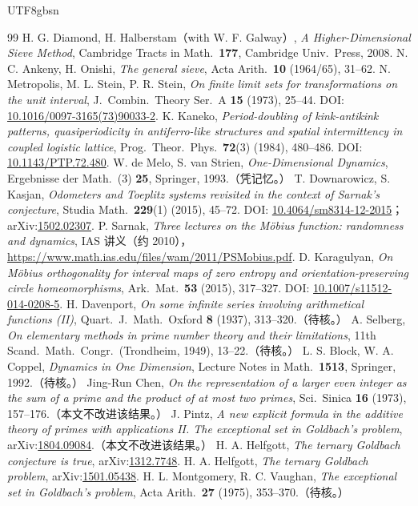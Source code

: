 \documentclass[11pt,a4paper]{article}
\theoremstyle{plain}
\theoremstyle{definition}
\begin{document}
\begin{CJK}{UTF8}{gbsn}
\begin{thebibliography}{99}
 H. G. Diamond, H. Halberstam（with W. F. Galway）, \emph{A Higher-Dimensional Sieve Method}, Cambridge Tracts in Math.\ \textbf{177}, Cambridge Univ.\ Press, 2008.
 N. C. Ankeny, H. Onishi, \emph{The general sieve}, Acta Arith.\ \textbf{10} (1964/65), 31--62.
 N. Metropolis, M. L. Stein, P. R. Stein, \emph{On finite limit sets for transformations on the unit interval},
J.\ Combin.\ Theory Ser.\ A \textbf{15} (1973), 25--44. DOI: \url{10.1016/0097-3165(73)90033-2}.
 K. Kaneko, \emph{Period-doubling of kink-antikink patterns, quasiperiodicity in antiferro-like structures and spatial intermittency in coupled logistic lattice},
Prog.\ Theor.\ Phys.\ \textbf{72}(3) (1984), 480--486. DOI: \url{10.1143/PTP.72.480}.
 W. de Melo, S. van Strien, \emph{One-Dimensional Dynamics}, Ergebnisse der Math.\ (3) \textbf{25}, Springer, 1993.（凭记忆。）
 T. Downarowicz, S. Kasjan, \emph{Odometers and Toeplitz systems revisited in the context of Sarnak's conjecture},
Studia Math.\ \textbf{229}(1) (2015), 45--72. DOI: \url{10.4064/sm8314-12-2015}；arXiv:\url{1502.02307}.
 P. Sarnak, \emph{Three lectures on the M\"obius function: randomness and dynamics}, IAS 讲义（约 2010），
\url{https://www.math.ias.edu/files/wam/2011/PSMobius.pdf}.
 D. Karagulyan, \emph{On M\"obius orthogonality for interval maps of zero entropy and orientation-preserving circle homeomorphisms},
Ark.\ Mat.\ \textbf{53} (2015), 317--327. DOI: \url{10.1007/s11512-014-0208-5}.
 H. Davenport, \emph{On some infinite series involving arithmetical functions (II)}, Quart.\ J.\ Math.\ Oxford \textbf{8} (1937), 313--320.（待核。）
 A. Selberg, \emph{On elementary methods in prime number theory and their limitations}, 11th Scand.\ Math.\ Congr.\ (Trondheim, 1949), 13--22.（待核。）
 L. S. Block, W. A. Coppel, \emph{Dynamics in One Dimension}, Lecture Notes in Math.\ \textbf{1513}, Springer, 1992.（待核。）
 Jing-Run Chen, \emph{On the representation of a larger even integer as the sum of a prime and the product of at most two primes},
Sci.\ Sinica \textbf{16} (1973), 157--176.（本文不改进该结果。）
 J. Pintz, \emph{A new explicit formula in the additive theory of primes with applications II. The exceptional set in Goldbach's problem},
arXiv:\url{1804.09084}.（本文不改进该结果。）
 H. A. Helfgott, \emph{The ternary Goldbach conjecture is true}, arXiv:\url{1312.7748}.
 H. A. Helfgott, \emph{The ternary Goldbach problem}, arXiv:\url{1501.05438}.
 H. L. Montgomery, R. C. Vaughan, \emph{The exceptional set in Goldbach's problem}, Acta Arith.\ \textbf{27} (1975), 353--370.（待核。）
\end{thebibliography}

\end{CJK}
\end{document}
